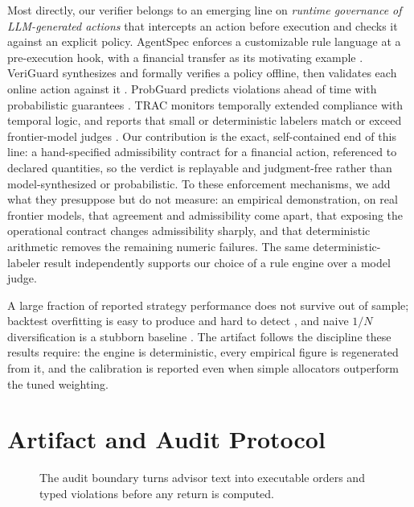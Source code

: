 \documentclass[sigconf,review,anonymous]{acmart}
\begin{document}
Most directly, our verifier belongs to an emerging line on \emph{runtime governance of LLM-generated actions} that intercepts an action before execution and checks it against an explicit policy. AgentSpec enforces a customizable rule language at a pre-execution hook, with a financial transfer as its motivating example \cite{wang2025agentspec}. VeriGuard synthesizes and formally verifies a policy offline, then validates each online action against it \cite{miculicich2025veriguard}. ProbGuard predicts violations ahead of time with probabilistic guarantees \cite{wang2026probguard}. TRAC monitors temporally extended compliance with temporal logic, and reports that small or deterministic labelers match or exceed frontier-model judges \cite{alamdari2026formalmethods}. Our contribution is the exact, self-contained end of this line: a hand-specified admissibility contract for a financial action, referenced to declared quantities, so the verdict is replayable and judgment-free rather than model-synthesized or probabilistic. To these enforcement mechanisms, we add what they presuppose but do not measure: an empirical demonstration, on real frontier models, that agreement and admissibility come apart, that exposing the operational contract changes admissibility sharply, and that deterministic arithmetic removes the remaining numeric failures. The same deterministic-labeler result independently supports our choice of a rule engine over a model judge.

A large fraction of reported strategy performance does not survive out of sample; backtest overfitting is easy to produce and hard to detect \cite{bailey2014pseudo}, and naive $1/N$ diversification is a stubborn baseline \cite{demiguel2009naive}. The artifact follows the discipline these results require: the engine is deterministic, every empirical figure is regenerated from it, and the calibration is reported even when simple allocators outperform the tuned weighting.

\section{Artifact and Audit Protocol}
\label{sec:audit}

\begin{figure}[t]
  \centering
  \resizebox{0.86\textwidth}{!}{}
\caption{The audit boundary turns advisor text into executable orders and typed violations before any return is computed.}
  \label{fig:workflow}
\end{figure}
\end{document}
